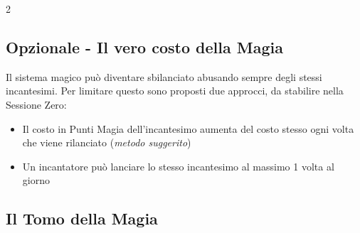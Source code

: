\begin{multicols}{2}


\subsection{Opzionale - Il vero costo della Magia}

Il sistema magico può diventare sbilanciato abusando sempre degli stessi incantesimi. Per limitare questo sono proposti due approcci, da stabilire nella Sessione Zero:

\begin{itemize}[leftmargin=*] \setlength{\itemsep}{0pt}
\item Il costo in Punti Magia dell'incantesimo aumenta del costo stesso ogni volta che viene rilanciato (\emph{metodo suggerito})
\item Un incantatore può lanciare lo stesso incantesimo al massimo 1 volta al giorno
\end{itemize}

\subsection{Il Tomo della Magia}\label{magietomodellamagia}


\end{multicols}
